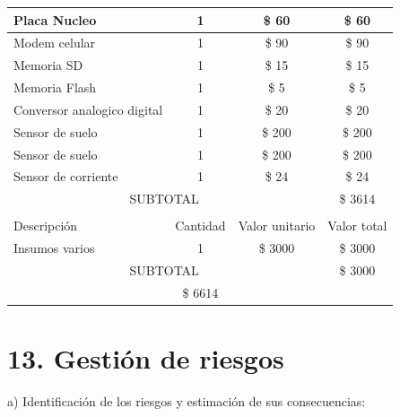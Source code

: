 \documentclass[
11pt, %
]{charter}
\begin{document}
\begin{table}[htpb]
\begin{tabularx}{\linewidth}{@{}|X|c|r|r|@{}}
Placa Nucleo &
  \multicolumn{1}{c|}{1} &
  \multicolumn{1}{c|}{\$ 60} &
  \multicolumn{1}{c|}{\$ 60} \\ \hline
Modem celular &
  \multicolumn{1}{c|}{1} &
  \multicolumn{1}{c|}{\$ 90} &
  \multicolumn{1}{c|}{\$ 90} \\ \hline
Memoria SD &
  \multicolumn{1}{c|}{1} &
  \multicolumn{1}{c|}{\$ 15} &
  \multicolumn{1}{c|}{\$ 15} \\ \hline
Memoria Flash &
  \multicolumn{1}{c|}{1} &
  \multicolumn{1}{c|}{\$ 5} &
  \multicolumn{1}{c|}{\$ 5} \\ \hline
Conversor analogico digital &
  \multicolumn{1}{c|}{1} &
  \multicolumn{1}{c|}{\$ 20} &
  \multicolumn{1}{c|}{\$ 20} \\ \hline
Sensor de suelo &
  \multicolumn{1}{c|}{1} &
  \multicolumn{1}{c|}{\$ 200} &
  \multicolumn{1}{c|}{\$ 200} \\ \hline
Sensor de suelo &
  \multicolumn{1}{c|}{1} &
  \multicolumn{1}{c|}{\$ 200} &
  \multicolumn{1}{c|}{\$ 200} \\ \hline
Sensor de corriente &
  \multicolumn{1}{c|}{1} &
  \multicolumn{1}{c|}{\$ 24} &
  \multicolumn{1}{c|}{\$ 24} \\ \hline
\multicolumn{3}{|c|}{SUBTOTAL} & 
  \multicolumn{1}{c|}{\$ 3614} \\ \hline
\rowcolor[HTML]{C0C0C0} 
\multicolumn{4}{|c|}{\cellcolor[HTML]{C0C0C0}COSTOS INDIRECTOS} \\ \hline
\rowcolor[HTML]{C0C0C0} 
Descripción &
  \multicolumn{1}{c|}{\cellcolor[HTML]{C0C0C0}Cantidad} &
  \multicolumn{1}{c|}{\cellcolor[HTML]{C0C0C0}Valor unitario} &
  \multicolumn{1}{c|}{\cellcolor[HTML]{C0C0C0}Valor total} \\ \hline
\multicolumn{1}{|l|}{ Insumos varios} &
  \multicolumn{1}{c|}{1} &
  \multicolumn{1}{c|}{\$ 3000} &
  \multicolumn{1}{c|}{\$ 3000} \\ \hline
\multicolumn{3}{|c|}{SUBTOTAL} &
  \multicolumn{1}{c|}{\$ 3000} \\ \hline
\rowcolor[HTML]{C0C0C0}
\multicolumn{3}{|c|}{TOTAL} & \$ 6614
   \\ \hline
\end{tabularx}%
\end{table}


\section{13. Gestión de riesgos}
\label{sec:riesgos}


a) Identificación de los riesgos y estimación de sus consecuencias:
 
\end{document}

